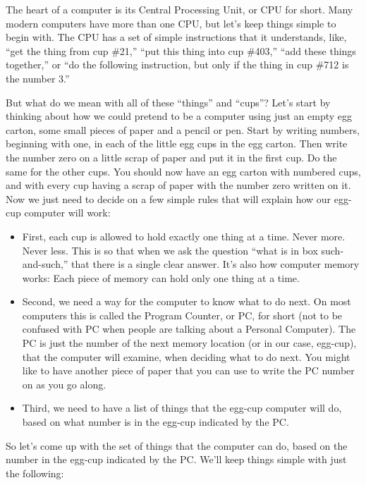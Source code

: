 The heart of a computer is its Central Processing Unit, or CPU for short.  Many modern computers have more than one CPU, but let's keep
things simple to begin with.  The CPU has a set of simple instructions that it understands, like, ``get the thing from cup \#21,'' ``put this thing into cup \#403,'' ``add these things together,'' or ``do the following instruction, but only if the thing in cup \#712 is the number 3.''

But what do we mean with all of these ``things'' and ``cups''? Let's start by thinking about how we could pretend to be a computer using
just an empty egg carton, some small pieces of paper and a pencil or pen.  Start by writing numbers, beginning with one, in each of the
little egg cups in the egg carton.  Then write the number zero on a little scrap of paper and put it in the first cup.  Do the same for the other cups. You should now have an egg carton with numbered cups, and with every cup having a scrap of paper with the number zero written on it. Now we just need to decide on a few simple rules that will explain how our egg-cup computer will work:

\begin{itemize}
  \item First, each cup is allowed to hold exactly one thing at a time. Never more. Never less.  This is so that when we ask the question ``what is in box such-and-such,'' that there is a single clear answer. It's also how computer memory works: Each piece of memory can hold only one thing at a time.

  \item Second, we need a way for the computer to know what to do next. On most computers this is called the Program Counter, or PC, for short (not to be confused with PC when people are talking about a Personal Computer).  The PC is just the number of the next memory location (or in our case, egg-cup), that the computer will examine, when deciding what to do next.  You might like to have another piece of paper that you can use to write the PC number on as you go along.

  \item Third, we need to have a list of things that the egg-cup computer will do, based on what number is in the egg-cup indicated by the 
    PC.
\end{itemize}

So let's come up with the set of things that the computer can do, based on the number in the egg-cup indicated by the PC.  We'll keep things simple with just the following:

